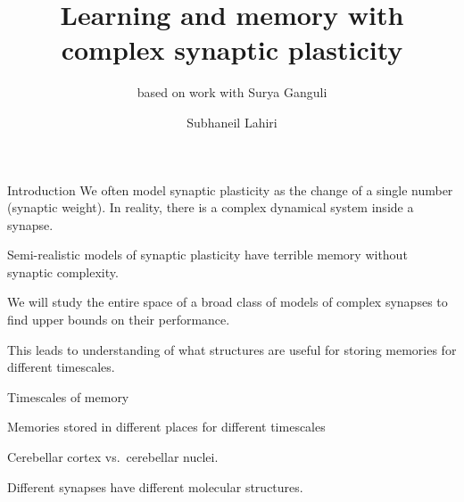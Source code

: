 \documentclass{beamer}%
\title[Complex synapses]{Learning and memory with complex synaptic plasticity}
\subtitle{\small{based on work with Surya Ganguli}
}
\author{Subhaneil Lahiri%
}
\institute[Stanford]{%
Stanford University, Applied Physics
}
\begin{document}

\begin{frame}
%
 \titlepage
%
\end{frame}


\begin{frame}{Introduction}
%
 We often model synaptic plasticity as the change of a single number (synaptic weight).
 In reality, there is a complex dynamical system inside a synapse.

 \vp Semi-realistic models of synaptic plasticity have terrible memory without synaptic complexity.

 \vp We will study the entire space of a broad class of models of complex synapses to find upper bounds on their performance.

 \vp This leads to understanding of what structures are useful for storing memories for different timescales.
%
\end{frame}


\begin{frame}{Timescales of memory}
%
 \parbox[t]{0.47\linewidth}{
 Memories stored in different places for different timescales
 \begin{center}
 \end{center}

 \cf Cerebellar cortex vs.\ cerebellar nuclei.

 }
 \hspace{0.03\linewidth}
 \parbox[t]{0.47\linewidth}{
 Different synapses have different molecular structures.
 \begin{center}
 \end{center}
 }
%
\end{frame}

\end{document}
